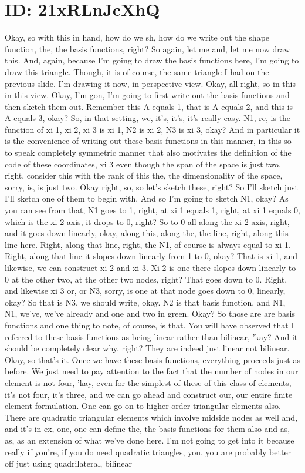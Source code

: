 \documentclass[10pt]{article}
\begin{document}
\section*{ID: 21xRLnJcXhQ}
Okay, so with this in hand, how do we sh, how do we write out the shape function, the, the basis functions, right? So again, let me and, let me now draw this. And, again, because I'm going to draw the basis functions here, I'm going to draw this triangle. Though, it is of course, the same triangle I had on the previous slide. I'm drawing it now, in perspective view. Okay, all right, so in this in this view. Okay, I'm gon, I'm going to first write out the basis functions and then sketch them out. Remember this A equals 1, that is A equals 2, and this is A equals 3, okay? So, in that setting, we, it's, it's, it's really easy. N1, re, is the function of xi 1, xi 2, xi 3 is xi 1, N2 is xi 2, N3 is xi 3, okay? And in particular it is the convenience of writing out these basis functions in this manner, in this so to speak completely symmetric manner that also motivates the definition of the code of these coordinates, xi 3 even though the span of the space is just two, right, consider this with the rank of this the, the dimensionality of the space, sorry, is, is just two. Okay right, so, so let's sketch these, right? So I'll sketch just I'll sketch one of them to begin with. And so I'm going to sketch N1, okay? As you can see from that, N1 goes to 1, right, at xi 1 equals 1, right, at xi 1 equals 0, which is the xi 2 axis, it drops to 0, right? So to 0 all along the xi 2 axis, right, and it goes down linearly, okay, along this, along the, the line, right, along this line here. Right, along that line, right, the N1, of course is always equal to xi 1. Right, along that line it slopes down linearly from 1 to 0, okay? That is xi 1, and likewise, we can construct xi 2 and xi 3. Xi 2 is one there slopes down linearly to 0 at the other two, at the other two nodes, right? That goes down to 0. Right, and likewise xi 3 or, or N3, sorry, is one at that node goes down to 0, linearly, okay? So that is N3.  we should write, okay. N2 is that basis function, and N1, N1, we've, we've already  and one and two in green. Okay? So those are are basis functions and one thing to note, of course, is that. You will have observed that I referred to these basis functions as being linear rather than bilinear, 'kay? And it should be completely clear why, right? They are indeed just linear not bilinear. Okay, so that's it. Once we have these basis functions, everything proceeds just as before. We just need to pay attention to the fact that the number of nodes in our element is not four, 'kay, even for the simplest of these of this class of elements, it's not four, it's three, and we can go ahead and construct our, our entire finite element formulation. One can go on to higher order triangular elements also. There are quadratic triangular elements which involve midside nodes as well and, and it's in ex, one, one can define the, the basis functions for them also and as, as, as an extension of what we've done here. I'm not going to get into it because really if you're, if you do need quadratic triangles, you, you are probably better off just using quadrilateral, bilinear 
\end{document}
